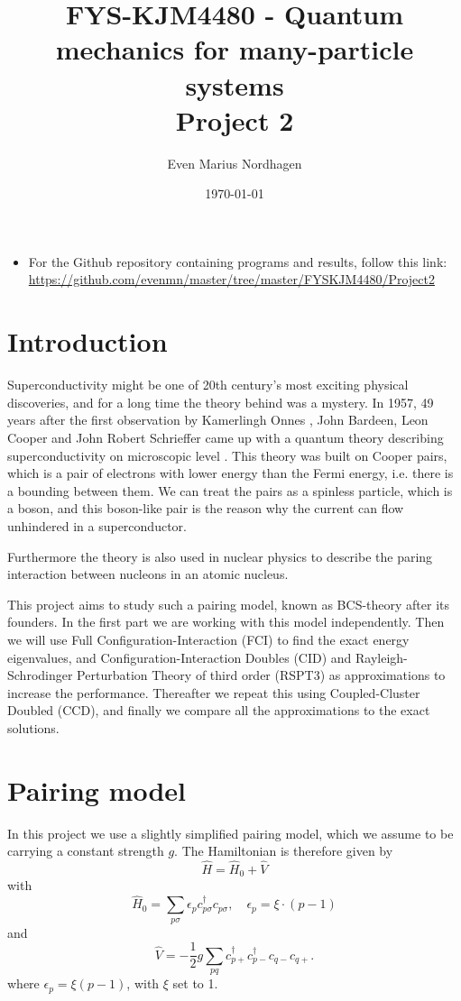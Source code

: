 \documentclass[norsk,a4paper,12pt]{article}
\title{FYS-KJM4480 - Quantum mechanics for many-particle systems \\\vspace{2mm} \Large{Project 2}}
\author{\large Even Marius Nordhagen}
\date\today
\begin{document}
\maketitle

\begin{itemize}
\item For the Github repository containing programs and results, follow this link: 
\url{https://github.com/evenmn/master/tree/master/FYSKJM4480/Project2}
\end{itemize}

\section*{Introduction}
Superconductivity might be one of 20th century's most exciting physical discoveries, and for a long time the theory behind was a mystery. In 1957, 49 years after the first observation by Kamerlingh Onnes \cite {Onnes}, John Bardeen, Leon Cooper and John Robert Schrieffer came up with a quantum theory describing superconductivity on microscopic level \cite {BCS}. This theory was built on Cooper pairs, which is a pair of electrons with lower energy than the Fermi energy, i.e. there is a bounding between them. We can treat the pairs as a spinless particle, which is a boson, and this boson-like pair is the reason why the current can flow unhindered in a superconductor. 

Furthermore the theory is also used in nuclear physics to describe the paring interaction between nucleons in an atomic nucleus. 

This project aims to study such a pairing model, known as BCS-theory after its founders. In the first part we are working with this model independently. Then we will use Full Configuration-Interaction (FCI) to find the exact energy eigenvalues, and Configuration-Interaction Doubles (CID) and Rayleigh-Schrodinger Perturbation Theory of third order (RSPT3) as approximations to increase the performance. Thereafter we repeat this using Coupled-Cluster Doubled (CCD), and finally we compare all the approximations to the exact solutions.
\newpage

\section{Pairing model}
In this project we use a slightly simplified pairing model, which we assume to be carrying a constant strength $g$. The Hamiltonian is therefore given by
\begin{equation}
\hat{H}=\hat{H}_0+\hat{V}
\end{equation}
with
\begin{equation}
\hat{H}_0=\sum_{p\sigma}\epsilon_pc_{p\sigma}^{\dagger}c_{p\sigma},\quad \epsilon_p=\xi\cdot(p-1)
\label{eq:H0_init}
\end{equation}
and
\begin{equation}
\hat{V}=-\frac{1}{2}g\sum_{pq}c_{p+}^{\dagger}c_{p-}^{\dagger}c_{q-}c_{q+}.
\label{eq:V_init}
\end{equation}
where $\epsilon_p=\xi(p-1)$, with $\xi$ set to 1.
\end{document}
